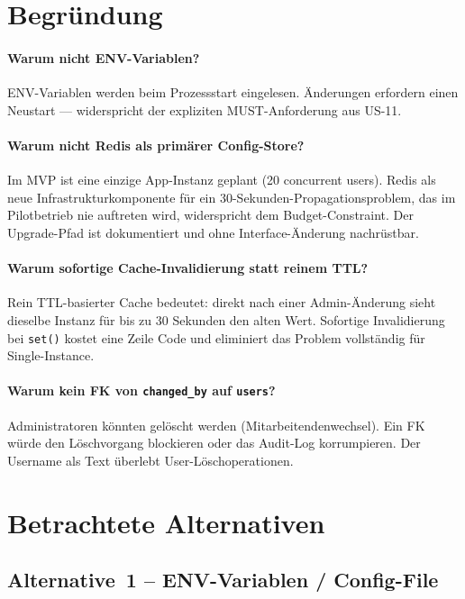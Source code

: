\documentclass[a4paper, 11pt, oneside]{report}
\newcommand{\code}[1]{\texttt{\small #1}}
\begin{document}
\section{Begründung}

\paragraph{Warum nicht ENV-Variablen?}
ENV-Variablen werden beim Prozessstart eingelesen. Änderungen erfordern
einen Neustart --- widerspricht der expliziten MUST-Anforderung aus US-11.

\paragraph{Warum nicht Redis als primärer Config-Store?}
Im MVP ist eine einzige App-Instanz geplant (20 concurrent users). Redis als
neue Infrastrukturkomponente für ein 30-Sekunden-Propagationsproblem, das im
Pilotbetrieb nie auftreten wird, widerspricht dem Budget-Constraint.
Der Upgrade-Pfad ist dokumentiert und ohne Interface-Änderung nachrüstbar.

\paragraph{Warum sofortige Cache-Invalidierung statt reinem TTL?}
Rein TTL-basierter Cache bedeutet: direkt nach einer Admin-Änderung sieht
dieselbe Instanz für bis zu 30 Sekunden den alten Wert. Sofortige
Invalidierung bei \code{set()} kostet eine Zeile Code und eliminiert
das Problem vollständig für Single-Instance.

\paragraph{Warum kein FK von \code{changed\_by} auf \code{users}?}
Administratoren könnten gelöscht werden (Mitarbeitendenwechsel). Ein FK würde
den Löschvorgang blockieren oder das Audit-Log korrumpieren. Der Username
als Text überlebt User-Löschoperationen.

\section{Betrachtete Alternativen}

\subsection{Alternative~1 -- ENV-Variablen / Config-File}
\end{document}
